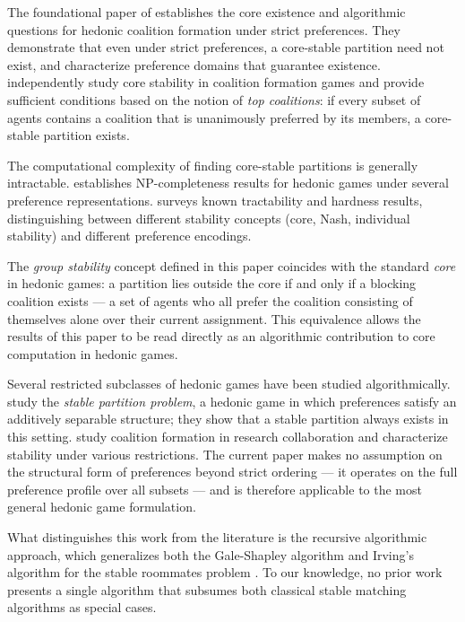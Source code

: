 \documentclass{elsarticle}
\begin{document}
The foundational paper of \cite{bogomolnaia02} establishes the core existence and algorithmic questions for hedonic coalition formation under strict preferences. They demonstrate that even under strict preferences, a core-stable partition need not exist, and characterize preference domains that guarantee existence. \cite{banerjee01} independently study core stability in coalition formation games and provide sufficient conditions based on the notion of \emph{top coalitions}: if every subset of agents contains a coalition that is unanimously preferred by its members, a core-stable partition exists.

The computational complexity of finding core-stable partitions is generally intractable. \cite{ballester04} establishes NP-completeness results for hedonic games under several preference representations. \cite{woeginger13} surveys known tractability and hardness results, distinguishing between different stability concepts (core, Nash, individual stability) and different preference encodings.

The \emph{group stability} concept defined in this paper coincides with the standard \emph{core} in hedonic games: a partition lies outside the core if and only if a blocking coalition exists --- a set of agents who all prefer the coalition consisting of themselves alone over their current assignment. This equivalence allows the results of this paper to be read directly as an algorithmic contribution to core computation in hedonic games.

Several restricted subclasses of hedonic games have been studied algorithmically. \cite{cechlárová02} study the \emph{stable partition problem}, a hedonic game in which preferences satisfy an additively separable structure; they show that a stable partition always exists in this setting. \cite{alcalde04} study coalition formation in research collaboration and characterize stability under various restrictions. The current paper makes no assumption on the structural form of preferences beyond strict ordering --- it operates on the full preference profile over all subsets --- and is therefore applicable to the most general hedonic game formulation.

What distinguishes this work from the literature is the recursive algorithmic approach, which generalizes both the Gale-Shapley algorithm \citep{galeshapley62} and Irving's algorithm for the stable roommates problem \citep{irving85}. To our knowledge, no prior work presents a single algorithm that subsumes both classical stable matching algorithms as special cases.
\end{document}
